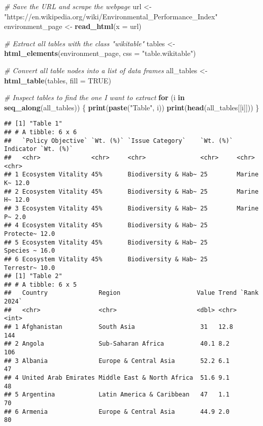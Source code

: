 \documentclass[
]{article}
\newenvironment{Shaded}{\begin{snugshade}}{\end{snugshade}}
\newcommand{\AttributeTok}[1]{\textcolor[rgb]{0.13,0.29,0.53}{#1}}
\newcommand{\CommentTok}[1]{\textcolor[rgb]{0.56,0.35,0.01}{\textit{#1}}}
\newcommand{\ConstantTok}[1]{\textcolor[rgb]{0.56,0.35,0.01}{#1}}
\newcommand{\ControlFlowTok}[1]{\textcolor[rgb]{0.13,0.29,0.53}{\textbf{#1}}}
\newcommand{\FunctionTok}[1]{\textcolor[rgb]{0.13,0.29,0.53}{\textbf{#1}}}
\newcommand{\NormalTok}[1]{#1}
\newcommand{\OtherTok}[1]{\textcolor[rgb]{0.56,0.35,0.01}{#1}}
\newcommand{\StringTok}[1]{\textcolor[rgb]{0.31,0.60,0.02}{#1}}
\begin{document}
\begin{Shaded}
\begin{Highlighting}[]
\CommentTok{\# Save the URL and scrape the webpage}
\NormalTok{url }\OtherTok{\textless{}{-}} \StringTok{"https://en.wikipedia.org/wiki/Environmental\_Performance\_Index"}
\NormalTok{environment\_page }\OtherTok{\textless{}{-}} \FunctionTok{read\_html}\NormalTok{(}\AttributeTok{x =}\NormalTok{ url)}

\CommentTok{\# Extract all tables with the class "wikitable"}
\NormalTok{tables }\OtherTok{\textless{}{-}} \FunctionTok{html\_elements}\NormalTok{(environment\_page, }\AttributeTok{css =} \StringTok{"table.wikitable"}\NormalTok{)}

\CommentTok{\# Convert all table nodes into a list of data frames}
\NormalTok{all\_tables }\OtherTok{\textless{}{-}} \FunctionTok{html\_table}\NormalTok{(tables, }\AttributeTok{fill =} \ConstantTok{TRUE}\NormalTok{)}

\CommentTok{\# Inspect tables to find the one I want to extract}
\ControlFlowTok{for}\NormalTok{ (i }\ControlFlowTok{in} \FunctionTok{seq\_along}\NormalTok{(all\_tables)) \{}
  \FunctionTok{print}\NormalTok{(}\FunctionTok{paste}\NormalTok{(}\StringTok{"Table"}\NormalTok{, i))}
  \FunctionTok{print}\NormalTok{(}\FunctionTok{head}\NormalTok{(all\_tables[[i]]))}
\NormalTok{\}}
\end{Highlighting}
\end{Shaded}

\begin{verbatim}
## [1] "Table 1"
## # A tibble: 6 x 6
##   `Policy Objective` `Wt. (%)` `Issue Category`    `Wt. (%)` Indicator `Wt. (%)`
##   <chr>              <chr>     <chr>               <chr>     <chr>     <chr>    
## 1 Ecosystem Vitality 45%       Biodiversity & Hab~ 25        Marine K~ 12.0     
## 2 Ecosystem Vitality 45%       Biodiversity & Hab~ 25        Marine H~ 12.0     
## 3 Ecosystem Vitality 45%       Biodiversity & Hab~ 25        Marine P~ 2.0      
## 4 Ecosystem Vitality 45%       Biodiversity & Hab~ 25        Protecte~ 12.0     
## 5 Ecosystem Vitality 45%       Biodiversity & Hab~ 25        Species ~ 16.0     
## 6 Ecosystem Vitality 45%       Biodiversity & Hab~ 25        Terrestr~ 10.0     
## [1] "Table 2"
## # A tibble: 6 x 5
##   Country              Region                     Value Trend `Rank 2024`
##   <chr>                <chr>                      <dbl> <chr>       <int>
## 1 Afghanistan          South Asia                  31   12.8          144
## 2 Angola               Sub-Saharan Africa          40.1 8.2           106
## 3 Albania              Europe & Central Asia       52.2 6.1            47
## 4 United Arab Emirates Middle East & North Africa  51.6 9.1            48
## 5 Argentina            Latin America & Caribbean   47   1.1            70
## 6 Armenia              Europe & Central Asia       44.9 2.0            80
\end{verbatim}
\end{document}
